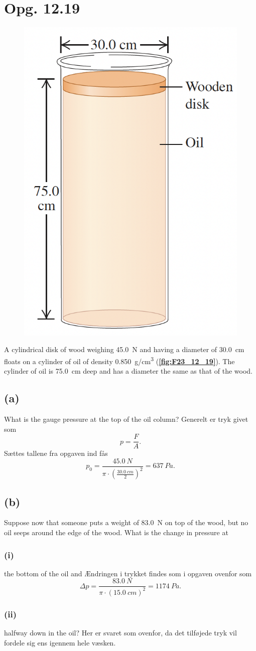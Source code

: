 \documentclass[12pt]{article}
\theoremstyle{definition}
\begin{document}
\section*{Opg. 12.19}
\begin{figure} [ht]
  \centering
  \caption{}
  \includegraphics[width=0.3\linewidth]{../figures/F23_12_19.png}
  \label{fig:F23_12_19}
\end{figure}
A cylindrical disk of wood weighing \qty{45,0}{N} and having a diameter of \qty{30,0}{cm} floats on a cylinder of oil of density \qty{0,850}{g/cm^3} (\textbf{\autoref{fig:F23_12_19}}). The cylinder of oil is \qty{75,0}{cm}  deep and has a diameter the same as that of the wood.

\subsection*{(a)}
What is the gauge pressure at the top of the oil column?
\bigbreak
Generelt er tryk givet som
\[ 
p = \frac{F}{A}
.\]
Sættes tallene fra opgaven ind fås
\[ 
p_0 = \frac{\qty{45,0}{N}}{\pi \cdot \left( \frac{\qty{30,0}{cm}}{2} \right)^2} = \qty{637}{Pa} 
.\]

\subsection*{(b)}
Suppose now that someone puts a weight of \qty{83,0}{N} on top of the wood, but no oil seeps around the edge of the wood. What is the change in pressure at

\subsubsection*{(i)}
the bottom of the oil and
\bigbreak
Ændringen i trykket findes som i opgaven ovenfor som
\[ 
\Delta p = \frac{\qty{83,0}{N}}{\pi \cdot \left( \qty{15,0}{cm}  \right)^2} = \qty{1174}{Pa} 
.\]


\subsubsection*{(ii)}
halfway down in the oil?
\bigbreak
Her er svaret som ovenfor, da det tilføjede tryk vil fordele sig ens igennem hele væsken. 
\end{document}
